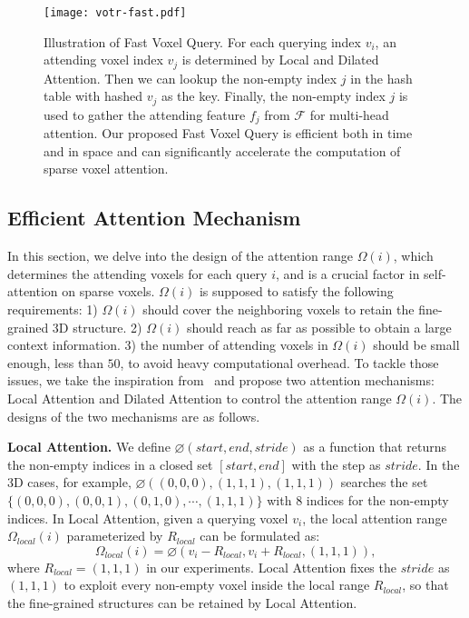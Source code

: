 \documentclass[10pt,twocolumn,letterpaper]{article}
\begin{document}
\begin{figure*}[!t]
\centering
\texttt{[image: votr-fast.pdf]}
\caption{Illustration of Fast Voxel Query. For each querying index $v_{i}$, an attending voxel index $v_{j}$ is determined by Local and Dilated Attention. Then we can lookup the non-empty index $j$ in the hash table with hashed $v_{j}$ as the key. Finally, the non-empty index $j$ is used to gather the attending feature $f_{j}$ from $\mathcal{F}$ for multi-head attention. Our proposed Fast Voxel Query is efficient both in time and in space and can significantly accelerate the computation of sparse voxel attention.}
\label{fig_fastvq}
\end{figure*}

\subsection{Efficient Attention Mechanism}
In this section, we delve into the design of the attention range $\Omega(i)$, which determines the attending voxels for each query $i$, and is a crucial factor in self-attention on sparse voxels. $\Omega(i)$ is supposed to satisfy the following requirements: 1) $\Omega(i)$ should cover the neighboring voxels to retain the fine-grained 3D structure. 2) $\Omega(i)$ should reach as far as possible to obtain a large context information. 3) the number of attending voxels in $\Omega(i)$ should be small enough, \eg less than $50$, to avoid heavy computational overhead. To tackle those issues, we take the inspiration from~\cite{zaheer2020big} and propose two attention mechanisms: Local Attention and Dilated Attention to control the attention range $\Omega(i)$. The designs of the two mechanisms are as follows.

\textbf{Local Attention.} We define $\varnothing(start, end, stride)$ as a function that returns the non-empty indices in a closed set $[start, end]$ with the step as $stride$. In the 3D cases, for example, $\varnothing((0,0,0), (1,1,1), (1,1,1))$ searches the set $\{(0,0,0), (0,0,1), (0,1,0), \cdots, (1,1,1)\}$ with $8$ indices for the non-empty indices. In Local Attention, given a querying voxel $v_{i}$, the local attention range $\Omega_{local}(i)$ parameterized by $R_{local}$ can be formulated as: 
\begin{equation} \label{3.1.5}
    \Omega_{local}(i) = \varnothing(v_{i} - R_{local}, v_{i} + R_{local}, (1,1,1)),
\end{equation}
where $R_{local} = (1,1,1)$ in our experiments. Local Attention fixes the $stride$ as $(1,1,1)$ to exploit every non-empty voxel inside the local range $R_{local}$, so that the fine-grained structures can be retained by Local Attention.
\end{document}
